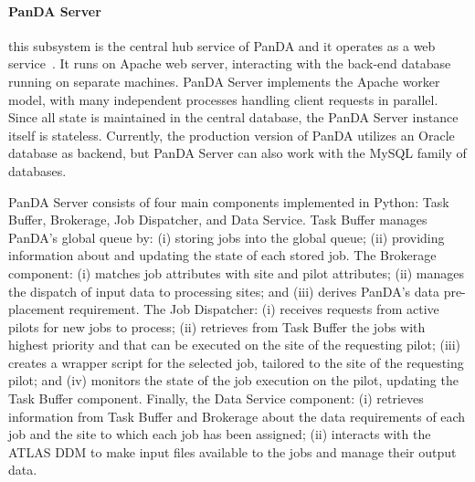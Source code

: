 \paragraph{\textbf{PanDA Server}} this subsystem is the central hub service of
PanDA and it operates as a web service~\cite{maeno2011overview}. It runs on
Apache web server, interacting with the back-end database running on separate
machines. PanDA Server implements the Apache worker model, with many independent
processes handling client requests in parallel. Since all state is maintained in
the central database, the PanDA Server instance itself is stateless. Currently,
the production version of PanDA utilizes an Oracle database as backend, but
PanDA Server can also work with the MySQL family of databases.



PanDA Server consists of four main components implemented in Python: Task
Buffer, Brokerage, Job Dispatcher, and Data Service. Task Buffer manages PanDA's
global queue by: (i) storing jobs into the global queue; (ii) providing
information about and updating the state of each stored job. The Brokerage
component: (i) matches job attributes with site and pilot attributes; (ii)
manages the dispatch of input data to processing sites; and (iii) derives
PanDA's data pre-placement requirement. The Job Dispatcher: (i) receives
requests from active pilots for new jobs to process; (ii) retrieves from Task
Buffer the jobs with highest priority and that can be executed on the site of
the requesting pilot; (iii) creates a wrapper script for the selected job,
tailored to the site of the requesting pilot; and (iv) monitors the state of
the job execution on the pilot, updating the Task Buffer component. Finally, the
Data Service component: (i) retrieves information from Task Buffer and Brokerage
about the data requirements of each job and the site to which each job has been
assigned; (ii) interacts with the ATLAS DDM to make input files available to the
jobs and manage their output data.


